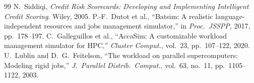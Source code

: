 \documentclass[conference]{IEEEtran}
\begin{document}
{\begin{thebibliography}{99}
 N.~Siddiqi, \emph{Credit Risk Scorecards: Developing and Implementing Intelligent Credit Scoring}. Wiley, 2005.
 P.-F.~Dutot et al., ``Batsim: A realistic language-independent resources and jobs management simulator,'' in \emph{Proc.\ JSSPP}, 2017, pp.~178--197.
 C.~Galleguillos et al., ``AccaSim: A customizable workload management simulator for HPC,'' \emph{Cluster Comput.}, vol.~23, pp.~107--122, 2020.
 U.~Lublin and D.~G.~Feitelson, ``The workload on parallel supercomputers: Modeling rigid jobs,'' \emph{J.\ Parallel Distrib.\ Comput.}, vol.~63, no.~11, pp.~1105--1122, 2003.
\end{thebibliography}}
\end{document}
